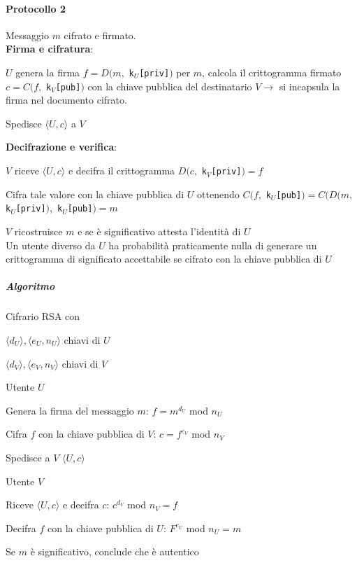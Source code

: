 \documentclass[10pt]{book}
\begin{document}
\paragraph{Protocollo 2} Messaggio $m$ cifrato e firmato.\\
\textbf{Firma e cifratura}:
\begin{list}{}{}
	\item $U$ genera la firma $f = D(m,$ \texttt{k$_U$[priv]}$)$ per $m$, calcola il crittogramma firmato $c = C(f,$ \texttt{k$_V$[pub]}$)$ con la chiave pubblica del destinatario $V\rightarrow$ si incapsula la firma nel documento cifrato.
	\item Spedisce $\langle U,c\rangle$ a $V$
\end{list}
\textbf{Decifrazione e verifica}:
\begin{list}{}{}
	\item $V$ riceve $\langle U,c\rangle$ e decifra il crittogramma $D(c,$ \texttt{k$_V$[priv]}$) = f$
	\item Cifra tale valore con la chiave pubblica di $U$ ottenendo $C(f,$ \texttt{k$_U$[pub]}$) = C(D(m,$ \texttt{k$_U$[priv]}$),$ \texttt{k$_U$[pub]}$) = m$
	\item $V$ ricostruisce $m$ e se è significativo attesta l'identità di $U$\\
	Un utente diverso da $U$ ha probabilità praticamente nulla di generare un crittogramma di significato accettabile se cifrato con la chiave pubblica di $U$
\end{list}
\subparagraph{Algoritmo} Cifrario RSA con\begin{list}{}{}
	\item $\langle d_U\rangle,\langle e_U, n_U\rangle$ chiavi di $U$
	\item $\langle d_V\rangle,\langle e_V, n_V\rangle$ chiavi di $V$
\end{list}
Utente $U$\begin{list}{}{}
	\item Genera la firma del messaggio $m$: $f = m^{d_U}$ mod $n_U$
	\item Cifra $f$ con la chiave pubblica di $V$: $c = f^{e_V}$ mod $n_V$
	\item Spedisce a $V$ $\langle U,c\rangle$

\end{list}
Utente $V$\begin{list}{}{}
	\item Riceve $\langle U,c\rangle$ e decifra $c$: $c^{d_V}$ mod $n_V = f$
	\item Decifra $f$ con la chiave pubblica di $U$: $F^{e_U}$ mod $n_U = m$
	\item Se $m$ è significativo, conclude che è autentico
\end{list}
\end{document}
